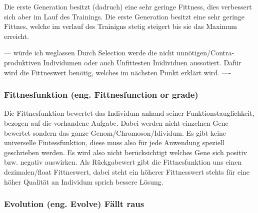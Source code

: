 Die erste Generation besitzt (dadruch) eine sehr geringe Fittness, dies verbessert sich aber im Lauf des Trainings.
Die erste Generation besitzt eine sehr geringe Fittnes, welche im verlauf des Trainigns stetig steigert bis sie das Maximum erreicht.

--- würde ich weglassen
Durch Selection werde die nicht unnötigen/Contra-produktiven Individumen oder auch Unfittesten Inidividuen aussotiert.
Dafür wird die Fittneswert benötig, welches im nächsten Punkt erklärt wird.
----


\subsubsection{Fittnesfunktion (eng. Fittnesfunction or grade)}
Die Fittnesfunktion bewertet das Individum anhand seiner Funktionstauglichkeit, bezogen auf die vorhandene Aufgabe. Dabei werden nicht einzelnen Gene bewertet sondern das ganze Genom/Chromoson/Idividum. Es gibt keine universelle Fintessfunktion, diese muss also für jede Anwendung speziell geschrieben werden. Es wird also nicht berücksichtigt welches Gene sich positiv bzw. negativ auswirken. Als Rückgabewert gibt die Fittnesfunktion uns einen dezimalen/float Fittneswert, dabei steht ein höherer Fittnesswert stehts für eine höher Qualität an Individum sprich bessere Lösung.

\iffalse
\subsubsection{Evolution (eng. Evolve) Fällt raus}

